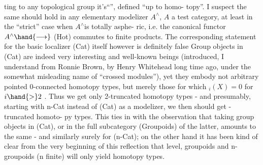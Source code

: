
ting to any topological group it's``\hand{\uline{\textcolor{black}{classifying space}}}'',  defined ``up to homo-%
topy''.  I suspect the same should hold in any elementary modelizer $A^{\wedge}$,
$A$ a test category,  at least in the ``strict'' case when $A^{\wedge}$\hand{/}is totally asphe-%
ric,  i.e.  the canonical functor  $A^{\wedge}\hand{\longrightarrow}$ (Hot)  commutes to finite products.
The corresponding statement for the basic localizer (Cat) itself however is
definitely false  Group objects in (Cat) are indeed very interesting and
well-known beings  (introduced,  I understand from Ronnie Brown, by Henry
Whitehead long time ago,  under the somewhat misleading name of ``crossed
modules''),  yet they embody not arbitrary pointed 0-connected homotopy
types,  but merely those for which \hand{$\pi$}$_i(X) = 0$ for $i \hand{>} 2$ .  Thus we get only
2-truncated homotopy types  -  and presumably,   starting with n-Cat
instead of (Cat) as a modelizer,  we then should get -truncated homoto-%
py types.  This ties in with the observation that taking group objects in
(Cat),  or in the full subcategory  (Groupoids)  of the latter,  amounts to
the same  -  and similarly surely for (n-Cat);  on the other hand it has
been kind of clear from the very beginning of this reflection that 
\hand{\uline{\textcolor{black}{finite}}} level,  groupoids and n-groupoids (n finite) will only yield \hand{\uline{\textcolor{black}{trunca-}}}%
\hand{\uline{\textcolor{black}{ted}}} homotopy types.

